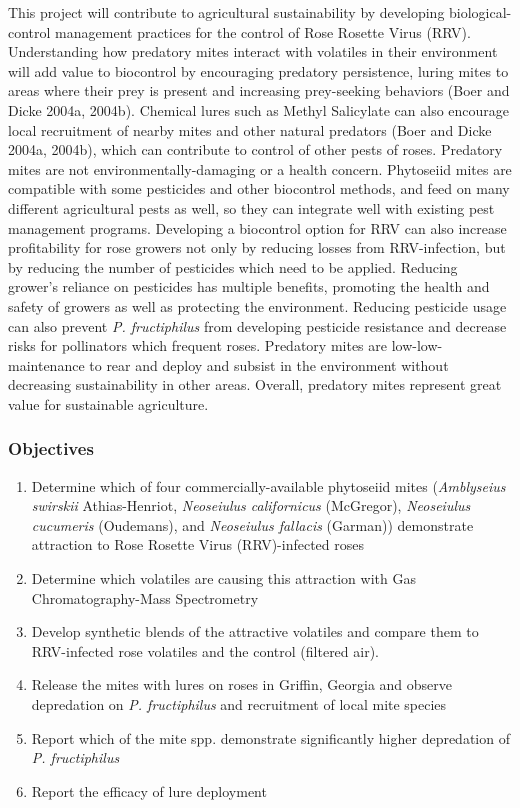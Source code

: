 \documentclass[12pt,final,CPage]{ufthesis}
\begin{document}
{  This project will contribute to agricultural sustainability by developing biological-control management practices for the control of Rose Rosette Virus (RRV). Understanding how predatory mites interact with volatiles in their environment will add value to biocontrol by encouraging predatory persistence, luring mites to areas where their prey is present and increasing prey-seeking behaviors (Boer and Dicke 2004a, 2004b). Chemical lures such as Methyl Salicylate can also encourage local recruitment of nearby mites and other natural predators (Boer and Dicke 2004a, 2004b), which can contribute to control of other pests of roses. Predatory mites are not environmentally-damaging or a health concern. Phytoseiid mites are compatible with some pesticides and other biocontrol methods, and feed on many different agricultural pests as well, so they can integrate well with existing pest management programs. Developing a biocontrol option for RRV can also increase profitability for rose growers not only by reducing losses from RRV-infection, but by reducing the number of pesticides which need to be applied. Reducing grower's reliance on pesticides has multiple benefits, promoting the health and safety of growers as well as protecting the environment. Reducing pesticide usage can also prevent \emph{P. fructiphilus} from developing pesticide resistance and decrease risks for pollinators which frequent roses. Predatory mites are low-low-maintenance to rear and deploy and subsist in the environment without decreasing sustainability in other areas. Overall, predatory mites represent great value for sustainable agriculture.

  \hypertarget{objectives}{%
  \subsubsection{Objectives}\label{objectives}}
  \begin{enumerate}
  \def\labelenumi{\arabic{enumi}.}
  \tightlist
  \item
    Determine which of four commercially-available phytoseiid mites (\emph{Amblyseius swirskii} Athias-Henriot, \emph{Neoseiulus californicus} (McGregor), \emph{Neoseiulus cucumeris} (Oudemans), and \emph{Neoseiulus fallacis} (Garman)) demonstrate attraction to Rose Rosette Virus (RRV)-infected roses
  \item
    Determine which volatiles are causing this attraction with Gas Chromatography-Mass Spectrometry
  \item
    Develop synthetic blends of the attractive volatiles and compare them to RRV-infected rose volatiles and the control (filtered air).
  \item
    Release the mites with lures on roses in Griffin, Georgia and observe depredation on \emph{P. fructiphilus} and recruitment of local mite species
  \item
    Report which of the mite spp. demonstrate significantly higher depredation of \emph{P. fructiphilus}
  \item
    Report the efficacy of lure deployment
  \end{enumerate}
  \hypertarget{approach-and-methods}{%
}}
\end{document}
